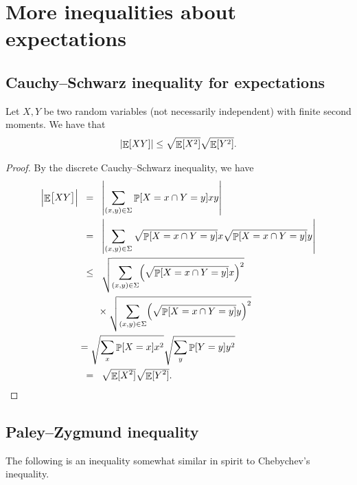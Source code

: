 \section{More inequalities about expectations}

\subsection{Cauchy–Schwarz inequality for expectations}

\begin{theorem}
    Let $X, Y$ be two random variables (not necessarily
    independent) with finite second moments. We have that
    \begin{equation*}
        \left| {\mathop{\mathbb{E}}\!\left[ { XY } \right]} \right|
        \leq \sqrt{ \mathop{\mathbb{E}}\!\left[ {X^2} \right]}  \sqrt{ \mathop{\mathbb{E}}\!\left[ {Y^2} \right]} .
    \end{equation*}
\end{theorem}
\begin{proof}
    By the discrete Cauchy–Schwarz inequality, we have
    \begin{align*}
        \cardin{\Ex{ XY \bigr.}\Bigr.}
        &\EQ
        \cardin{\sum_{(x,y) \in \Sigma} \Prob{ X=x \cap Y=y} xy}
        \\&
        \EQ
        \cardin{\sum_{(x,y) \in \Sigma} \sqrt{\Prob{ X=x \cap Y=y}} x
        \sqrt{\Prob{ X=x \cap Y=y}}y}
      \\&
      \LEQ
      \sqrt{\sum_{(x,y) \in \Sigma} \pth{\sqrt{\Prob{ X=x \cap Y=y}} x}^2}
      \\&\qquad\times%
      \sqrt{\sum_{(x,y) \in \Sigma}  \pth{\sqrt{\Prob{ X=x \cap Y=y}}y}^2}
      \\&
      =
      \sqrt{\sum_{x} \Prob{ X=x } x^2}
      \sqrt{\sum_{y}  \Prob{Y=y}y^2}
      \\&
      \EQ%
      \sqrt{\Ex{\smash{X^2}}} \sqrt{\Ex{\smash{Y^2}}}.
    \end{align*}
\end{proof}

\subsection{Paley–Zygmund inequality}

The following is an inequality somewhat similar in spirit to
Chebychev's inequality.

